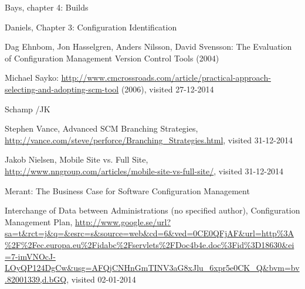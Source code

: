 \documentclass[10pt]{article}
\begin{document}
\begin{thebibliography}{1}
 Bays, chapter 4: Builds

 Daniels, Chapter 3: Configuration Identification

 Dag Ehnbom, Jon Hasselgren, Anders Nilsson, David Svensson: The Evaluation of Configuration Management Version Control Tools (2004)

 Michael Sayko: \url{http://www.cmcrossroads.com/article/practical-approach-selecting-and-adopting-scm-tool} (2006), visited 27-12-2014

 Schamp /JK

 Stephen Vance, Advanced SCM Branching Strategies, \url{http://vance.com/steve/perforce/Branching_Strategies.html}, visited 31-12-2014

 Jakob Nielsen, Mobile Site vs. Full Site, \url{http://www.nngroup.com/articles/mobile-site-vs-full-site/}, visited 31-12-2014

 Merant: The Business Case for Software Configuration Management

 Interchange of Data between Administrations (no specified author), Configuration Management Plan, \url{http://www.google.se/url?sa=t&rct=j&q=&esrc=s&source=web&cd=6&ved=0CE0QFjAF&url=http\%3A\%2F\%2Fec.europa.eu\%2Fidabc\%2Fservlets\%2FDoc4b4e.doc\%3Fid\%3D18630&ei=7-imVNOcJ-LOyQP124DgCw&usg=AFQjCNHnGmTINV3aG8xJlu_6xpr5e0CK_Q&bvm=bv.82001339,d.bGQ}, visited 02-01-2014 

\end{thebibliography}
\end{document}
